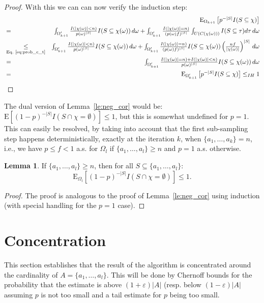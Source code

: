 \documentclass{article}
\newcommand{\expectation}{\mathrm{E}}
\newcommand{\eps}{\varepsilon}
\theoremstyle{definition}
\newtheorem{lemma}{Lemma}
\begin{document}
\begin{proof}
With this we can can now verify the induction step:
\begin{eqnarray*}
&  & \textstyle\expectation_{\Omega_{k+1}}\left[p^{-|S|} I(S \subseteq \chi)\right]  \\
& = &\textstyle \int_{\Omega'_{k+1}} \frac{I(|\chi(\omega)| < n)}{p(\omega)^{|S|}} I(S \subseteq \chi(\omega)) \, d \omega
+ \int_{\Omega'_{k+1}} \frac{I(|\chi(\omega)| = n)}{(p(\omega)f)^{|S|}} \int_{U(C(\chi(\omega)))} I(S \subseteq \tau) d \tau \, d \omega  \\
& \underset{\textrm{Eq.~\ref{eq:prob_c_t}}}{\leq} & \textstyle \int_{\Omega'_{k+1}} \frac{I(|\chi(\omega)| < n)}{p(\omega)^{|S|}} I(S \subseteq \chi(\omega)) \, d \omega
+ \int_{\Omega'_{k+1}} \frac{I(|\chi(\omega)| = n)}{(p(\omega)f)^{|S|}} I(S \subseteq \chi(\omega)) \left(\frac{nf}{|\chi(\omega)|}\right)^{|S|} \, d \omega  \\
& = & \textstyle \int_{\Omega'_{k+1}} \frac{I(|\chi(\omega)| = n)+I(|\chi(\omega)| < n)}{p(\omega)^{|S|}} I(S \subseteq \chi(\omega)) \, d \omega \\
& = & \textstyle \expectation_{\Omega'_{k+1}}\left[p^{-|S|} I(S \subseteq \chi) \right] \leq_{IH} 1
\end{eqnarray*}

\end{proof}
The dual version of Lemma~\ref{le:neg_cor} would be: $\expectation[ (1-p)^{-|S|} I(S \cap \chi=\emptyset) ] \leq 1$, but this is somewhat undefined for $p=1$.
This can easily be resolved, by taking into account that the first sub-sampling step happens deterministically, exactly at the iteration $k$, when $\{a_1,\ldots,a_k\} = n$,
i.e., we have $p \leq f < 1$ a.s. for $\Omega_l$ if $\{a_1,\ldots,a_l\} \geq n$ and $p=1$ a.s. otherwise.

\begin{lemma}
\label{le:neg_cor_2}
If $\{a_1,\ldots,a_l\} \geq n$, then for all $S \subseteq \{a_1,\ldots,a_l\}$:
\[
\expectation_{\Omega_l} \left[ (1-p)^{-|S|} I(S \cap \chi=\emptyset) \right] \leq 1 \textrm{.}
\]
\end{lemma}
\begin{proof}
The proof is analogous to the proof of Lemma~\ref{le:neg_cor} using induction (with special handling for the $p=1$ case).
\end{proof}

\section{Concentration}
This section establishes that the result of the algorithm is concentrated around the cardinality of $A = \{ a_1, \ldots, a_l \}$. This will be done by Chernoff bounds for the probability that the estimate is above $(1+\eps)|A|$ (resp. below $(1-\eps)|A|$ assuming $p$ is not too small and a tail estimate for $p$ being too small.
\end{document}
